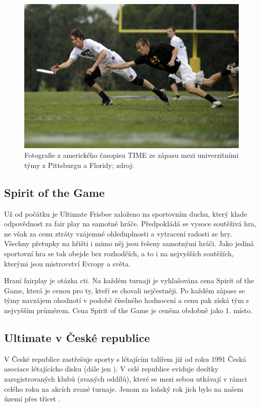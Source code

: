 \begin{figure}[ht!]
\centering
\includegraphics[width=130mm]{./images/ultimate-frisbee.jpg}
\caption{Fotografie z amerického časopisu TIME ze zápasu mezi univerzitními týmy z Pittsburgu a Floridy;
zdroj:~\cite{ultimate-time}\label{overflow}}
\end{figure}

\subsection{Spirit of the Game}

Už od počátku je Ultimate Frisbee založeno na sportovním duchu, který klade odpovědnost
za fair play na samotné hráče. Předpokládá se vysoce soutěživá hra, ne však za cenu ztráty
vzájemné ohleduplnosti a vytracení radosti ze hry. Všechny přetupky na hřišti i mimo něj jsou
řešeny samotnými hráči. Jako jediná sportovní hra se tak obejde bez rozhodčích, a to i
na nejvyšších soutěžích, kterými jsou mistrovství Evropy a světa.

Hraní fairplay je otázka cti. Na každém turnaji je vyhlašována cena Spirit of the Game,
která je cenou pro ty, kteří se chovali nejčestněji. Po každém zápase se týmy navzájem ohodnotí
v podobě číselného hodnocení a cenu pak získá tým s nejvyšším průměrem. Cena Spirit of the Game
je ceněna obdobně jako 1. místo.

\subsection{Ultimate v České republice}

V České republice zastřešuje sporty s létajícím talířem již od roku 1991\cite{cald-historie} Česká asociace
lé\-ta\-jícícho disku (dále jen ). V celé republice eviduje desítky zaregistrovaných
klubů (zvaných oddílů), které se mezi sebou utkávají v rámci celého roku na akcích zvané turnaje.
Jenom za loňský rok jich bylo na našem území přes třicet \cite{cald-kalendar}.

